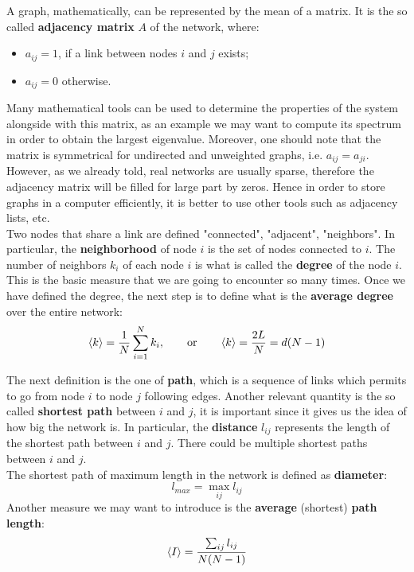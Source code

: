 \documentclass[../main/main.tex]{subfiles}
\begin{document}
A graph, mathematically, can be represented by the mean of a matrix. It is the so called \textbf{adjacency matrix} \( A \) of the network, where:
\begin{itemize}
\item \( a_{ij} = 1 \), if a link between nodes \( i \) and \( j \) exists;
\item \( a_{ij} = 0 \) otherwise.
\end{itemize}
Many mathematical tools can be used to determine the properties of the system alongside with this matrix, as an example we may want to compute its spectrum in order to obtain the largest eigenvalue. Moreover, one should note that the matrix is symmetrical for undirected and unweighted graphs, i.e. \( a_{ij} = a_{ji} \).
However, as we already told, real networks are usually sparse, therefore the adjacency matrix will be filled for large part by zeros. Hence in order to store graphs in a computer efficiently, it is better to use other tools such as adjacency lists, etc.\\

Two nodes that share a link are defined "connected", "adjacent", "neighbors". In particular, the \textbf{neighborhood} of node \( i \) is the set of nodes connected to \( i \).
The number of neighbors \( k_i \) of each node \( i \) is what is called the \textbf{degree} of the node $i$. This is the basic measure that we are going to encounter so many times. Once we have defined the degree, the next step is to define what is the \textbf{average degree} over the entire network:
\begin{equation}
  \expval{k} = \frac{1}{N} \sum_{i=1}^{N} k_i, \qquad \text{or} \qquad \expval{k} = \frac{2L}{N} = d(N-1)
\end{equation}

The next definition is the one of \textbf{path}, which is a sequence of links which permits to go from node \( i \) to node \( j \) following edges. Another relevant quantity is the so called \textbf{shortest path} between \( i \) and \( j \), it is important since it gives us the idea of how big the network is. In particular, the \textbf{distance} \( l_{ij} \) represents the length of the shortest path between \( i \) and \( j \). There could be multiple shortest paths between \( i \) and \( j \).\\
The shortest path of maximum length in the network is defined as \textbf{diameter}:
\begin{equation*}
  l_{max} = \max_{ij} l_{ij}
\end{equation*}
Another measure we may want to introduce is the \textbf{average} (shortest) \textbf{path length}:
\begin{equation*}
  \expval{I} = \frac{\sum_{ij}^{} l_{ij} }{N(N-1)}
\end{equation*}
\end{document}
